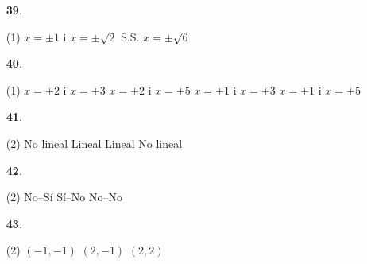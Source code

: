 \documentclass[a4paper, pdf, twoside]{book}
\begin{document}
\begin{multicols}{2}
\begin{enumerate}

 \item[\fontfamily{phv}\selectfont\color{blue}\textbf{39}. ]  \scalebox{0.6}{\simbolclau } 
 \begin{tasks}[column-sep=1em, item-indent=1.3333em](1)
	 \task $x=\pm 1$ i $x=\pm \sqrt {2}$
	 \task S.S.
	 \task $x=\pm \sqrt {6}$
\end{tasks}
 \end{enumerate}
\begin{enumerate}
\vspace{0.25cm}



 \item[\fontfamily{phv}\selectfont\color{blue}\textbf{40}. ] 
 \begin{tasks}[column-sep=1em, item-indent=1.3333em](1)
	 \task $x=\pm 2$ i $x=\pm 3$
	 \task $x=\pm 2$ i $x=\pm 5$
	 \task $x=\pm 1$ i $x=\pm 3$
	 \task $x=\pm 1$ i $x=\pm 5$
\end{tasks}
\vspace{0.25cm}



 \item[\fontfamily{phv}\selectfont\color{blue}\textbf{41}. ] 
 \begin{tasks}[column-sep=1em, item-indent=1.3333em](2)
	 \task No lineal
	 \task Lineal
	 \task Lineal
	 \task No lineal
\end{tasks}
\vspace{0.25cm}



 \item[\fontfamily{phv}\selectfont\color{blue}\textbf{42}. ] 
 \begin{tasks}[column-sep=1em, item-indent=1.3333em](2)
	 \task No--Sí
	 \task Sí--No
	 \task No--No
\end{tasks}
\vspace{0.25cm}



 \item[\fontfamily{phv}\selectfont\color{blue}\textbf{43}. ] 
 \begin{tasks}[column-sep=1em, item-indent=1.3333em](2)
	 \task $(-1,-1)$
	 \task $(2,-1)$
	 \task $(2,2)$
\end{tasks}
\vspace{0.25cm}




\end{enumerate}
\end{multicols}
\end{document}
